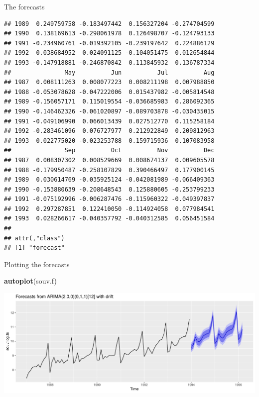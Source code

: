 \documentclass[
  ignorenonframetext,
]{beamer}
\newenvironment{Shaded}{\begin{snugshade}}{\end{snugshade}}
\newcommand{\KeywordTok}[1]{\textcolor[rgb]{0.13,0.29,0.53}{\textbf{#1}}}
\newcommand{\NormalTok}[1]{#1}
\begin{document}
\begin{frame}[fragile]{The forecasts}
\begin{verbatim}
## 1989  0.249759758 -0.183497442  0.156327204 -0.274704599
## 1990  0.138169613 -0.298061978  0.126498707 -0.124793133
## 1991 -0.234960761 -0.019392105 -0.239197642  0.224886129
## 1992  0.038684952  0.024091125 -0.104051475  0.012654844
## 1993 -0.147918881 -0.246870842  0.113845932  0.136787334
##               May          Jun          Jul          Aug
## 1987  0.008111263  0.008077223  0.008211198  0.007988850
## 1988 -0.053078628 -0.047222006  0.015437982 -0.005814548
## 1989 -0.156057171  0.115019554 -0.036685983  0.286092365
## 1990 -0.146462326 -0.061020897 -0.089703878 -0.030435015
## 1991 -0.049106990  0.066013439  0.027512770  0.115258184
## 1992 -0.283461096  0.076727977  0.212922849  0.209812963
## 1993  0.022775020 -0.023253788  0.159715936  0.107083958
##               Sep          Oct          Nov          Dec
## 1987  0.008307302  0.008529669  0.008674137  0.009605578
## 1988 -0.179950487 -0.258107829  0.390466497  0.177900145
## 1989  0.030614769 -0.035925124 -0.042081989 -0.066409363
## 1990 -0.153880639 -0.208648543  0.125880605 -0.253799233
## 1991 -0.075192996 -0.006287476 -0.115960322 -0.049397837
## 1992  0.297287851  0.122410050 -0.114924058  0.077984541
## 1993  0.028266617 -0.040357792 -0.040312585  0.056451584
## 
## attr(,"class")
## [1] "forecast"
\end{verbatim}

\normalsize

\end{frame}

\begin{frame}[fragile]{Plotting the forecasts}
\protect\hypertarget{plotting-the-forecasts-1}{}

\begin{Shaded}
\begin{Highlighting}[]
\KeywordTok{autoplot}\NormalTok{(souv.f)}
\end{Highlighting}
\end{Shaded}

\includegraphics{slides_d29_files/figure-beamer/unnamed-chunk-580-1.pdf}

\end{frame}
\end{document}
